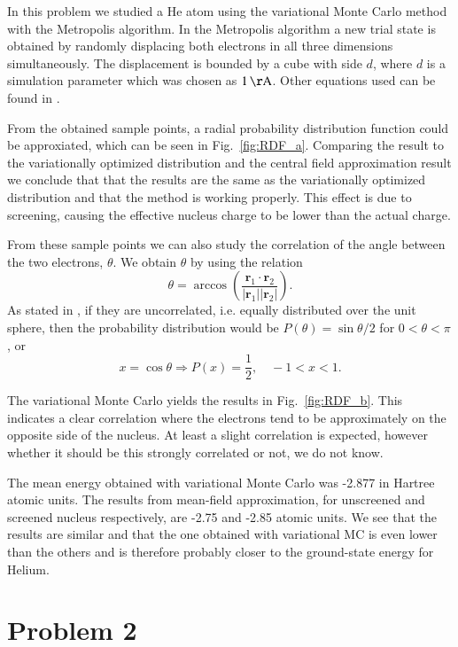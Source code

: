 In this problem we studied a He atom using the variational Monte Carlo method with the Metropolis algorithm. In the Metropolis algorithm a new trial state is obtained by randomly displacing both electrons in all three dimensions simultaneously. The displacement is bounded by a cube with side $d$, where $d$ is a simulation parameter which was chosen as $\unit[1]{\AA}$. Other equations used can be found in \cite{probdesc}.

From the obtained sample points, a radial probability distribution function could be approxiated, which can be seen in Fig.~\ref{fig:RDF_a}. Comparing the result to the variationally optimized distribution and the central field approximation result we conclude that that the results are the same as the variationally optimized distribution and that the method is working properly. This effect is due to screening, causing the effective nucleus charge to be lower than the actual charge.

From these sample points we can also study the correlation of the angle between the two electrons, $\theta$. We obtain $\theta$ by using the relation
\begin{equation}
\theta = \arccos \left( \frac{\mathbf{r}_1 \cdot \mathbf{r}_2}{|\mathbf{r}_1| |\mathbf{r}_2|} \right).
\end{equation}
As stated in \cite{probdesc}, if they are uncorrelated, i.e. equally distributed over the unit sphere, then the probability distribution would be $P(\theta) = \sin \theta / 2$ for $0 < \theta < \pi$, or
\begin{equation}
	x = \cos \theta \Rightarrow P(x) = \frac{1}{2},\quad -1 < x < 1.
\end{equation}

The variational Monte Carlo yields the results in Fig.~\ref{fig:RDF_b}. This indicates a clear correlation where the electrons tend to be approximately on the opposite side of the nucleus. At least a slight correlation is expected, however whether it should be this strongly correlated or not, we do not know.

The mean energy obtained with variational Monte Carlo was -2.877 in Hartree atomic units. The results from mean-field approximation, for unscreened and screened nucleus respectively, are -2.75 and -2.85 atomic units. We see that the results are similar and that the one obtained with variational MC is even lower than the others and is therefore probably closer to the ground-state energy for Helium.


\section*{Problem 2}

